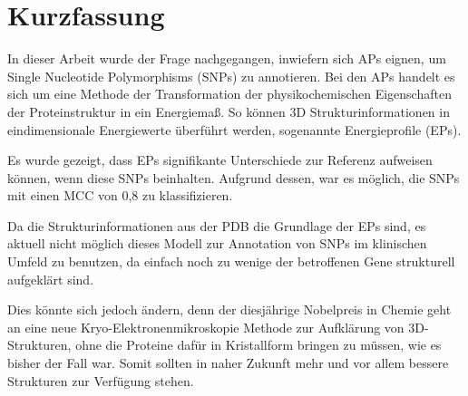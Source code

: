 \chapter{Kurzfassung}

In dieser Arbeit wurde der Frage nachgegangen, inwiefern sich \acf{APs} eignen, um Single Nucleotide Polymorphisms (SNPs) zu annotieren. Bei den \ac{APs} handelt es sich um eine Methode der Transformation der physikochemischen Eigenschaften der Proteinstruktur in ein Energiemaß. So können 3D Strukturinformationen in eindimensionale Energiewerte überführt werden, sogenannte Energieprofile (EPs).

Es wurde gezeigt, dass EPs signifikante Unterschiede zur Referenz aufweisen können, wenn diese \ac{SNP}s beinhalten. Aufgrund dessen, war es möglich, die \ac{SNP}s mit einen \ac{MCC} von 0,8 zu klassifizieren.

Da die Strukturinformationen aus der \ac{PDB} die Grundlage der \ac{EP}s sind, es aktuell nicht möglich dieses Modell zur Annotation von \ac{SNP}s im klinischen Umfeld zu benutzen, da einfach noch zu wenige der betroffenen Gene strukturell aufgeklärt sind.

Dies könnte sich jedoch ändern, denn der diesjährige Nobelpreis in Chemie geht an eine neue Kryo-Elektronenmikroskopie Methode zur Aufklärung von 3D-Strukturen, ohne die Proteine dafür in Kristallform bringen zu müssen, wie es bisher der Fall war. Somit sollten in naher Zukunft mehr und vor allem bessere Strukturen zur Verfügung stehen. 

